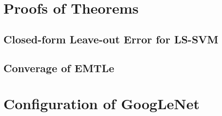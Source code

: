 \chapter{Proofs of Theorems}
%
\section{Closed-form Leave-out Error for LS-SVM}\label{app:cross}

\section{Converage of EMTLe}\label{app:converg}

\chapter{Configuration of GoogLeNet}

%